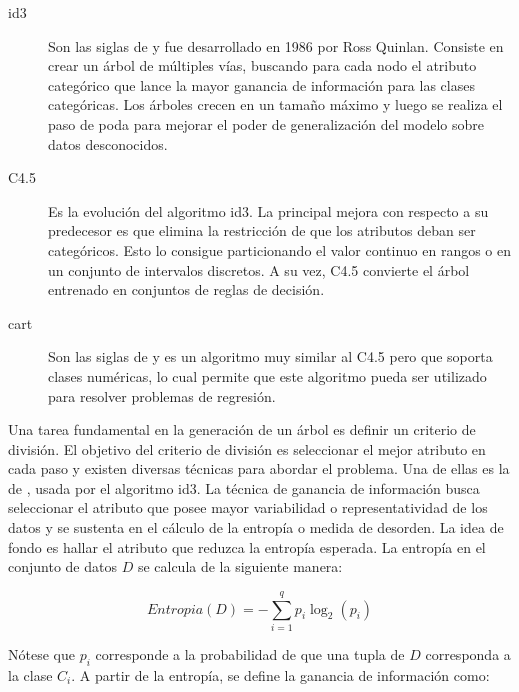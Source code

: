 \begin{description}

	\item[\acrshort{id3}] Son las siglas de  y
	      fue desarrollado en 1986 por Ross Quinlan. Consiste en crear un árbol de
	      múltiples vías, buscando para cada nodo el atributo categórico que lance
	      la mayor ganancia de información para las clases categóricas. Los árboles
	      crecen en un tamaño máximo y luego se realiza el paso de poda para mejorar
	      el poder de generalización del modelo sobre datos desconocidos.

	\item[C4.5] Es la evolución del algoritmo \acrshort{id3}. La principal mejora
	      con respecto a su predecesor es que elimina la restricción de que los
	      atributos deban ser categóricos. Esto lo consigue particionando el valor
	      continuo en rangos o en un conjunto de intervalos discretos. A su vez,
	      C4.5 convierte el árbol entrenado en conjuntos de reglas de decisión.

	\item[\acrshort{cart}] Son las siglas de  y
	      es un algoritmo muy similar al C4.5 pero que soporta clases numéricas, lo
	      cual permite que este algoritmo pueda ser utilizado para resolver
	      problemas de regresión.

\end{description}

Una tarea fundamental en la generación de un árbol es definir un criterio de
división. El objetivo del criterio de división es seleccionar el mejor atributo
en cada paso y existen diversas técnicas para abordar el problema. Una de ellas
es la de , usada por el algoritmo
\acrshort{id3}. La técnica de ganancia de información busca seleccionar el
atributo que posee mayor variabilidad o representatividad de los datos y se
sustenta en el cálculo de la entropía o medida de desorden. La idea de fondo es
hallar el atributo que reduzca la entropía esperada. La entropía en el conjunto
de datos $D$ se calcula de la siguiente manera:

\begin{equation}
	Entropia(D) = - \sum_{i=1}^{q} p_{i}\log_{2}(p_{i})
\end{equation}

Nótese que $p_{i}$ corresponde a la probabilidad de que una tupla de $D$
corresponda a la clase $C_{i}$.  A partir de la entropía, se define la ganancia
de información como:

